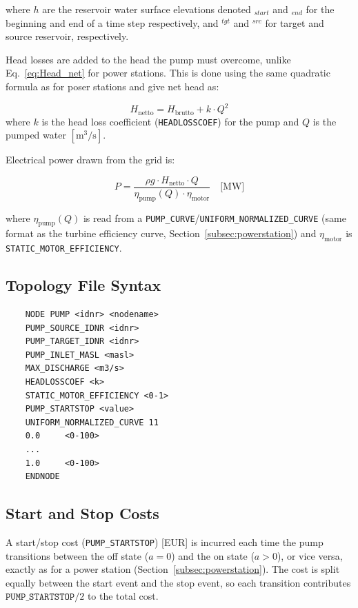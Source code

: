 \documentclass[a4paper, 12pt]{report}
\begin{document}
    where $h$ are the reservoir water surface elevations denoted $_{start}$ and $_{end}$ for the beginning and end of a time step respectively, and $^{tgt}$ and $^{src}$ for target and source reservoir, respectively.
    
	Head losses are added to the head the pump must overcome, unlike Eq.~\ref{eq:Head_net} for power stations. This is done using the same quadratic formula as for poser stations and give net head as: 

	\begin{equation}
		H_\mathrm{netto} = H_\mathrm{brutto} + k \cdot Q^2
	\end{equation}
    where $k$ is the head loss coefficient (\texttt{HEADLOSSCOEF}) for the pump and $Q$ is the pumped water $\mathrm{[m^3/s]}$.

	Electrical power drawn from the grid is:

	\begin{equation}
		P = \frac{\rho g \cdot H_\mathrm{netto} \cdot Q}{\eta_\mathrm{pump}(Q) \cdot \eta_\mathrm{motor}} \quad \text{[MW]}
	\end{equation}

	where $\eta_\mathrm{pump}(Q)$ is read from a \texttt{PUMP\_CURVE}/\texttt{UNIFORM\_NORMALIZED\_CURVE} (same format as the turbine efficiency curve, Section~\ref{subsec:powerstation}) and $\eta_\mathrm{motor}$ is \texttt{STATIC\_MOTOR\_EFFICIENCY}.

	\subsection{Topology File Syntax}

	\begin{verbatim}
    NODE PUMP <idnr> <nodename>
    PUMP_SOURCE_IDNR <idnr>
    PUMP_TARGET_IDNR <idnr>
    PUMP_INLET_MASL <masl>
    MAX_DISCHARGE <m3/s>
    HEADLOSSCOEF <k>
    STATIC_MOTOR_EFFICIENCY <0-1>
    PUMP_STARTSTOP <value>
    UNIFORM_NORMALIZED_CURVE 11
    0.0     <0-100>
    ...
    1.0     <0-100>
    ENDNODE
	\end{verbatim}

    \subsection{Start and Stop Costs}
    A start/stop cost (\texttt{PUMP\_STARTSTOP}) [EUR] is incurred each time the pump
    transitions between the off state ($a = 0$) and the on state ($a > 0$), or vice versa,
    exactly as for a power station (Section~\ref{subsec:powerstation}). The cost is split
    equally between the start event and the stop event, so each transition contributes
    $\texttt{PUMP\_STARTSTOP} / 2$ to the total cost.
\end{document}
